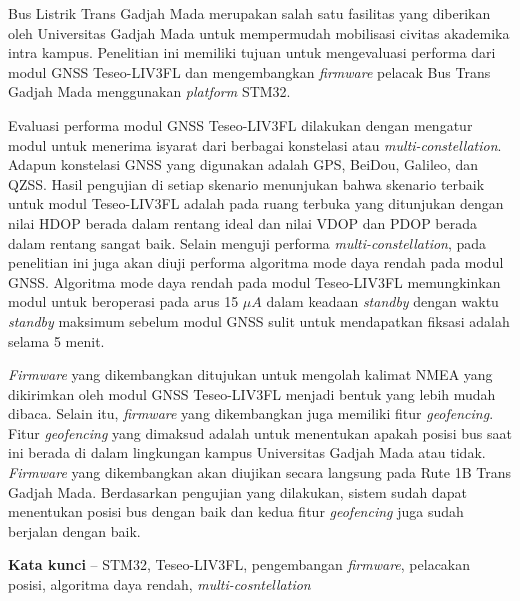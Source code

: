 Bus Listrik Trans Gadjah Mada merupakan salah satu fasilitas yang diberikan oleh Universitas Gadjah Mada untuk mempermudah mobilisasi civitas akademika intra kampus. Penelitian ini memiliki tujuan untuk mengevaluasi performa dari modul GNSS Teseo\hyp{}LIV3FL dan mengembangkan \textit{firmware} pelacak Bus Trans Gadjah Mada menggunakan \textit{platform} STM32.

Evaluasi performa modul GNSS Teseo\hyp{}LIV3FL dilakukan dengan mengatur modul untuk menerima isyarat dari berbagai konstelasi atau \textit{multi-constellation}. Adapun konstelasi GNSS yang digunakan adalah GPS, BeiDou, Galileo, dan QZSS. Hasil pengujian di setiap skenario menunjukan bahwa skenario terbaik untuk modul Teseo\hyp{}LIV3FL adalah pada ruang terbuka yang ditunjukan dengan nilai HDOP berada dalam rentang ideal dan nilai VDOP dan PDOP berada dalam rentang sangat baik. Selain menguji performa \textit{multi-constellation}, pada penelitian ini juga akan diuji performa algoritma mode daya rendah pada modul GNSS. Algoritma mode daya rendah pada modul Teseo\hyp{}LIV3FL memungkinkan modul untuk beroperasi pada arus 15 $\mu A$ dalam keadaan \textit{standby} dengan waktu \textit{standby} maksimum sebelum modul GNSS sulit untuk mendapatkan fiksasi adalah selama 5 menit.

\textit{Firmware} yang dikembangkan ditujukan untuk mengolah kalimat NMEA yang dikirimkan oleh modul GNSS Teseo\hyp{}LIV3FL menjadi bentuk yang lebih mudah dibaca. Selain itu, \textit{firmware} yang dikembangkan juga memiliki fitur \textit{geofencing}. Fitur \textit{geofencing} yang dimaksud adalah untuk menentukan apakah posisi bus saat ini berada di dalam lingkungan kampus Universitas Gadjah Mada atau tidak. \textit{Firmware} yang dikembangkan akan diujikan secara langsung pada Rute 1B Trans Gadjah Mada. Berdasarkan pengujian yang dilakukan, sistem sudah dapat menentukan posisi bus dengan baik dan kedua fitur \textit{geofencing} juga sudah berjalan dengan baik.

\noindent\textbf{Kata kunci} -- STM32, Teseo\hyp{}LIV3FL, pengembangan \textit{firmware}, pelacakan posisi, algoritma daya rendah, \textit{multi-cosntellation}